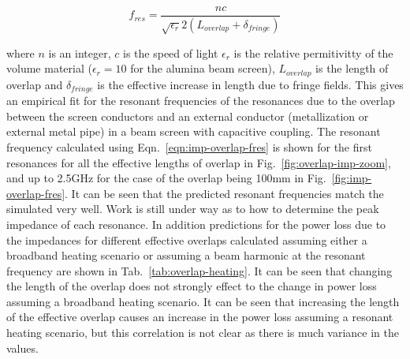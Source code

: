 \begin{equation}
f_{res} = \frac{nc}{\sqrt{\epsilon_{r}}2 \left( L_{overlap} + \delta_{fringe} \right)}
\label{eqn:imp-overlap-fres}
\end{equation}

where $n$ is an integer, $c$ is the speed of light $\epsilon_{r}$ is the relative permitivitty of the volume material ($\epsilon_{r}=10$ for the alumina beam screen), $L_{overlap}$ is the length of overlap and $\delta_{fringe}$ is the effective increase in length due to fringe fields. This gives an empirical fit for the resonant frequencies of the resonances due to the overlap between the screen conductors and an external conductor (metallization or external metal pipe) in a beam screen with capacitive coupling. The resonant frequency calculated using Eqn.~\ref{eqn:imp-overlap-fres} is shown for the first resonances for all the effective lengths of overlap in Fig.~\ref{fig:overlap-imp-zoom}, and up to 2.5GHz for the case of the overlap being 100mm in Fig.~\ref{fig:imp-overlap-fres}. It can be seen that the predicted resonant frequencies match the simulated very well. Work is still under way as to how to determine the peak impedance of each resonance. In addition predictions for the power loss due to the impedances for different effective overlaps calculated assuming either a broadband heating scenario or assuming a beam harmonic at the resonant frequency are shown in Tab.~\ref{tab:overlap-heating}. It can be seen that changing the length of the overlap does not strongly effect to the change in power loss assuming a broadband heating scenario. It can be seen that increasing the length of the effective overlap causes an increase in the power loss assuming a resonant heating scenario, but this correlation is not clear as there is much variance in the values.

